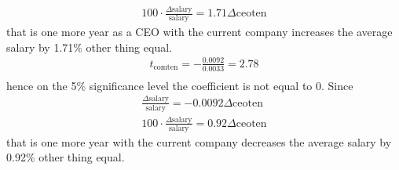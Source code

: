 \documentclass[a4paper]{article}
\begin{document}
\begin{enumerate}[(a)]
\begin{align*}
		100 \cdot \frac{\Delta \text{salary}}{\text{salary}} = 1.71 \Delta \text{ceoten}
	\end{align*}
	that is one more year as a CEO with the current company increases the average salary by 1.71\% other thing equal.
	\begin{align*}
	t_{\text{comten}} = -\frac{0.0092}{0.0033} = 2.78\\
	\end{align*}
	hence on the 5\% significance level the coefficient is not equal to 0.
	Since
	\begin{align*}
	\frac{\Delta \text{salary}}{\text{salary}} = -0.0092 \Delta \text{ceoten}\\
	100 \cdot \frac{\Delta \text{salary}}{\text{salary}} = 0.92 \Delta \text{ceoten}
	\end{align*}
	that is one more year with the current company decreases the average salary by 0.92\% other thing equal.
\end{enumerate}
\end{document}
